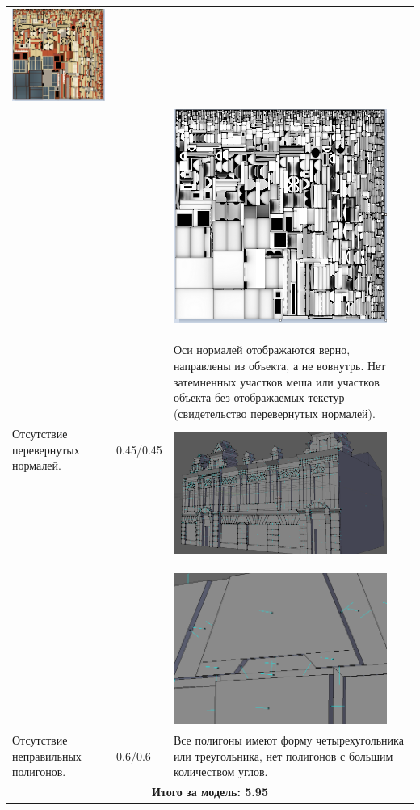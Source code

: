 \begin{longtable}{|p{4cm}|p{2.5cm}|p{7.5cm}|}
    \includegraphics[width=7cm]{src/tec_1}\\
    & & \includegraphics[width=7cm]{src/tec_2}\\
    \hline
    Отсутствие перевернутых нормалей. & 0.45/0.45 & Оси нормалей отображаются верно, направлены из объекта, а не вовнутрь. Нет затемненных участков меша или участков объекта без отображаемых текстур (свидетельство перевернутых нормалей).

    \includegraphics[width=7cm]{src/norm_1}\\
    & & \includegraphics[width=7cm]{src/norm_2}\\
    \hline
    Отсутствие неправильных полигонов. & 0.6/0.6 & Все полигоны имеют форму четырехугольника или треугольника, нет полигонов с большим количеством углов. \\
    \hline
    \multicolumn{3}{|c|}{\textbf{Итого за модель: 5.95}} \\
    \hline
\end{longtable}


